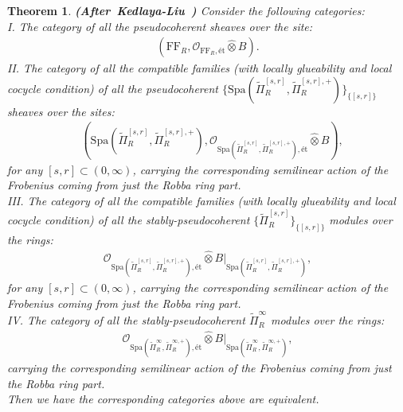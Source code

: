 \documentclass[12pt]{amsart}
\newtheorem{theorem}{Theorem}[section]
\theoremstyle{definition}
\numberwithin{equation}{section}
\begin{document}
\begin{theorem} \mbox{\bf{(After Kedlaya-Liu \cite[Theorem 4.6.1]{KL2})}} \label{theorem5.24}
Consider the following categories:\\
I. The category of all the pseudocoherent sheaves over the site:
\begin{align}
(\mathrm{FF}_R,\mathcal{O}_{\mathrm{FF}_R,\text{\'et}}\widehat{\otimes}B).	
\end{align}
II. The category of all the compatible families (with locally glueability and local cocycle condition) of all the pseudocoherent $\{\mathrm{Spa}(\widetilde{\Pi}_R^{[s,r]},\widetilde{\Pi}_R^{[s,r],+})\}_{\{[s,r]\}}$ sheaves over the sites:
\begin{align}
&(\mathrm{Spa}(\widetilde{\Pi}_R^{[s,r]},\widetilde{\Pi}_R^{[s,r],+}),\mathcal{O}_{\mathrm{Spa}(\widetilde{\Pi}_R^{[s,r]},\widetilde{\Pi}_R^{[s,r],+}),\text{\'et}}\widehat{\otimes}B),
\end{align}	
for any $[s,r]\subset (0,\infty)$, carrying the corresponding semilinear action of the Frobenius coming from just the Robba ring part.\\
III. The category of all the compatible families (with locally glueability and local cocycle condition) of all the stably-pseudocoherent $\{\widetilde{\Pi}_R^{[s,r]}\}_{\{[s,r]\}}$ modules over the rings:
\begin{align}
\mathcal{O}_{\mathrm{Spa}(\widetilde{\Pi}_R^{[s,r]},\widetilde{\Pi}_R^{[s,r],+}),\text{\'et}}\widehat{\otimes}B|_{\mathrm{Spa}(\widetilde{\Pi}_R^{[s,r]},\widetilde{\Pi}_R^{[s,r],+})},
\end{align}	
for any $[s,r]\subset (0,\infty)$, carrying the corresponding semilinear action of the Frobenius coming from just the Robba ring part.\\
IV. The category of all the stably-pseudocoherent $\widetilde{\Pi}_R^{\infty}$ modules over the rings:
\begin{align}
\mathcal{O}_{\mathrm{Spa}(\widetilde{\Pi}_R^{\infty},\widetilde{\Pi}_R^{\infty,+}),\text{\'et}}\widehat{\otimes}B|_{\mathrm{Spa}(\widetilde{\Pi}_R^{\infty},\widetilde{\Pi}_R^{\infty,+})},
\end{align}	
carrying the corresponding semilinear action of the Frobenius coming from just the Robba ring part.\\
Then we have the corresponding categories above are equivalent.




\end{theorem}
\end{document}
